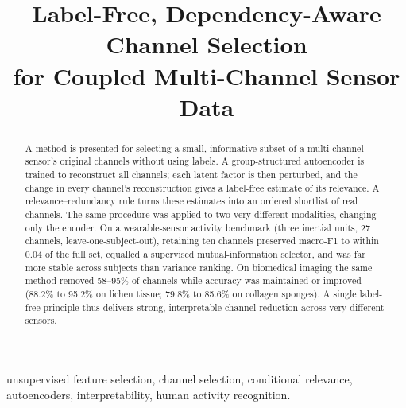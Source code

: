 \documentclass[conference]{IEEEtran}
\begin{document}
\title{Label-Free, Dependency-Aware Channel Selection\\
for Coupled Multi-Channel Sensor Data}

\author{
\and
{}
\and
{}
}

\maketitle

\begin{abstract}
A method is presented for selecting a small, informative subset of a multi-channel
sensor's original channels without using labels. A group-structured autoencoder is
trained to reconstruct all channels; each latent factor is then perturbed, and the
change in every channel's reconstruction gives a label-free estimate of its
relevance. A relevance--redundancy rule turns these estimates into an ordered
shortlist of real channels. The same procedure was applied to two very different
modalities, changing only the encoder. On a wearable-sensor activity benchmark
(three inertial units, 27 channels, leave-one-subject-out), retaining ten channels
preserved macro-F1 to within 0.04 of the full set, equalled a supervised
mutual-information selector, and was far more stable across subjects than variance
ranking. On biomedical imaging the same method removed 58--95\% of channels while
accuracy was maintained or improved (88.2\% to 95.2\% on lichen tissue; 79.8\% to
85.6\% on collagen sponges). A single label-free principle thus delivers strong,
interpretable channel reduction across very different sensors.
\end{abstract}

\begin{IEEEkeywords}
unsupervised feature selection, channel selection, conditional relevance,
autoencoders, interpretability, human activity recognition.
\end{IEEEkeywords}
\end{document}
